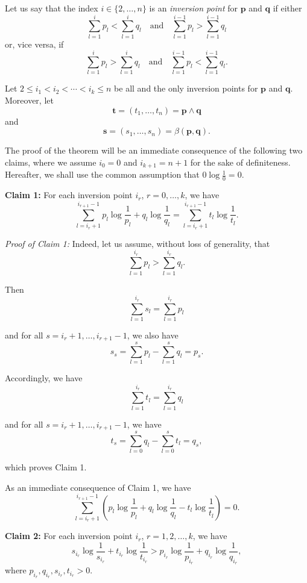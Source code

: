 Let us say that the index $i \in \{2, \ldots, n\}$ is an \emph{inversion point} for $\mathbf{p}$ and $\mathbf{q}$ if either
    \[
    \sum_{l=1}^{i} p_l < \sum_{l=1}^{i} q_l \quad \text{and} \quad \sum_{l=1}^{i-1} p_l > \sum_{l=1}^{i-1} q_l
    \]
    or, vice versa, if
    \[
    \sum_{l=1}^{i} p_l > \sum_{l=1}^{i} q_l \quad \text{and} \quad \sum_{l=1}^{i-1} p_l < \sum_{l=1}^{i-1} q_l.
    \]
    
    Let $2 \leq i_1 < i_2 < \cdots < i_k \leq n$ be all and the only inversion points for $\mathbf{p}$ and $\mathbf{q}$. Moreover, let
    \[
    \mathbf{t} = (t_1, \ldots, t_n) = \mathbf{p} \wedge \mathbf{q}
    \]
    and
    \[
    \mathbf{s} = (s_1, \ldots, s_n) = \beta(\mathbf{p}, \mathbf{q}).
    \]
    
    The proof of the theorem will be an immediate consequence of the following two claims, where we assume $i_0 = 0$ and $i_{k+1} = n + 1$ for the sake of definiteness. Hereafter, we shall use the common assumption that $0 \log \frac{1}{0} = 0$.
    
    \textbf{Claim 1:} For each inversion point $i_r$, $r = 0, \ldots, k$, we have
    \[
    \sum_{l=i_r+1}^{i_{r+1}-1} p_l \log \frac{1}{p_l} + q_l \log \frac{1}{q_l} = \sum_{l=i_r+1}^{i_{r+1}-1} t_l \log \frac{1}{t_l}.
    \]
    
    \emph{Proof of Claim 1:} Indeed, let us assume, without loss of generality, that
    \[
    \sum_{l=1}^{i_r} p_l > \sum_{l=1}^{i_r} q_l.
    \]
    
    Then
    \[
    \sum_{l=1}^{i_r} s_l = \sum_{l=1}^{i_r} p_l
    \]
    
    and for all $s = i_r + 1, \ldots, i_{r+1} - 1$, we also have
    \[
    s_s = \sum_{l=1}^{s} p_l - \sum_{l=1}^{s} q_l = p_s.
    \]
    
    Accordingly, we have
    \[
    \sum_{l=1}^{i_r} t_l = \sum_{l=1}^{i_r} q_l
    \]
    
    and for all $s = i_r + 1, \ldots, i_{r+1} - 1$, we have
    \[
    t_s = \sum_{l=0}^{s} q_l - \sum_{l=0}^{s} t_l = q_s,
    \]
    
    which proves Claim 1.
    
    As an immediate consequence of Claim 1, we have
    \[
    \sum_{l=i_r+1}^{i_{r+1}-1} \left( p_l \log \frac{1}{p_l} + q_l \log \frac{1}{q_l} - t_l \log \frac{1}{t_l} \right) = 0.
    \]
    
    \textbf{Claim 2:} For each inversion point $i_r$, $r = 1, 2, \ldots, k$, we have
    \[
    s_{i_r} \log \frac{1}{s_{i_r}} + t_{i_r} \log \frac{1}{t_{i_r}} > p_{i_r} \log \frac{1}{p_{i_r}} + q_{i_r} \log \frac{1}{q_{i_r}},
    \]
    where $p_{i_r}, q_{i_r}, s_{i_r}, t_{i_r} > 0$.
    
